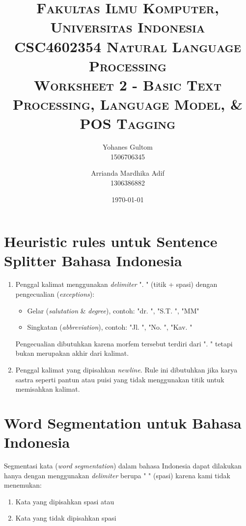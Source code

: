\documentclass[paper=a4, fontsize=11pt]{scrartcl} %
\title{	
\normalfont \normalsize 
\textsc{Fakultas Ilmu Komputer, Universitas Indonesia} \\ [8pt]  \textsc{CSC4602354  Natural Language Processing} \\ [8pt] 
\textsc {Worksheet 2 - Basic Text Processing, Language Model, \& POS Tagging}
}
\author{	
	\small Yohanes Gultom \\
	\small 1506706345
	\and
	\small Arrianda Mardhika Adif \\
	\small 1306386882
} %
\date{\normalsize\today} %
\numberwithin{equation}{section} %
\numberwithin{figure}{section} %
\numberwithin{table}{section} %
\begin{document}
\maketitle %


\section{Heuristic rules untuk Sentence Splitter Bahasa Indonesia}

\begin{enumerate}	
\item Penggal kalimat menggunakan {\em delimiter} ". " (titik + spasi) dengan pengecualian ({\em exceptions}): 
\begin{itemize}	
	\item Gelar ({\em salutation} \& {\em degree}), contoh: "dr. ", "S.T. ", "MM" 
	\item Singkatan ({\em abbreviation}), contoh: "Jl. ", "No. ", "Kav. " 
\end{itemize}
Pengecualian dibutuhkan karena morfem tersebut terdiri dari ". " tetapi bukan merupakan akhir dari kalimat.
\item Penggal kalimat yang dipisahkan {\em newline}. Rule ini dibutuhkan jika karya sastra seperti pantun atau puisi yang tidak menggunakan titik untuk memisahkan kalimat.
\end{enumerate}


\section{Word Segmentation untuk Bahasa Indonesia}

Segmentasi kata ({\em word segmentation}) dalam bahasa Indonesia dapat dilakukan hanya dengan menggunakan {\em delimiter} berupa " " (spasi) karena kami tidak menemukan:
\begin{enumerate}
	\item Kata yang dipisahkan spasi atau
	\item Kata yang tidak dipisahkan spasi
\end{enumerate}

\end{document}
